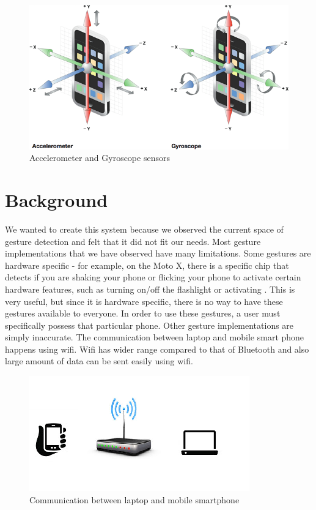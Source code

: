 \documentclass{sigchi}
\begin{document}
\begin{figure}[!t]
\centering
\includegraphics[width=0.9\columnwidth]{sensors}
\caption{Accelerometer and Gyroscope sensors}
\label{fig:figure1}
\end{figure}

\section{Background}

We wanted to create this system because we observed the current space of gesture detection and felt that it did not fit our needs. Most gesture implementations that we have observed have many limitations. Some gestures are hardware specific - for example, on the Moto X, there is a specific chip that detects if you are shaking your phone or flicking your phone to activate certain hardware features, such as turning on/off the flashlight or activating \cite{motox}. This is very useful, but since it is hardware specific, there is no way to have these gestures available to everyone. In order to use these gestures, a user must specifically possess that particular phone. Other gesture implementations are simply inaccurate. The communication between laptop and mobile smart phone happens using wifi. Wifi has wider range compared to that of Bluetooth and also large amount of data can be sent easily using wifi.

\begin{figure}[!t]
\centering
\includegraphics[width=0.8\columnwidth]{wifi}
\caption{Communication between laptop and mobile smartphone}
\label{fig:figure2}
\end{figure}
\end{document}
